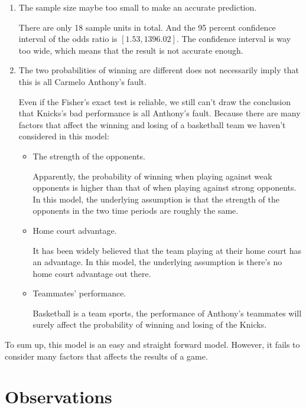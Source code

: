 \documentclass[12pt]{article}
\begin{document}
\begin{enumerate}
  \item The sample size maybe too small to make an accurate
    prediction.

  There are only 18 sample units in total. And the 95 percent
  confidence interval of the odds ratio is $[1.53, 1396.02]$. The
  confidence interval is way too wide, which means that the result is
  not accurate enough.
  \item The two probabilities of winning are different does not
    necessarily imply that this is all Carmelo Anthony's fault.

  Even if the Fisher's exact test is reliable, we still can't draw the
  conclusion that Knicks's bad performance is all Anthony's
  fault. Because there are many factors that affect the winning
  and losing of a basketball team we haven't considered in this model:

  \begin{itemize}
    \item The strength of the opponents.

      Apparently, the probability of winning when playing against
      weak opponents is higher than that of when playing against
      strong opponents. In this model, the underlying assumption is
      that the strength of the opponents in the two time periods are
      roughly the same.

    \item Home court advantage.

      It has been widely believed that the team playing at their home
      court has an advantage. In this model, the underlying assumption
      is there's no home court advantage out there.

    \item Teammates' performance.

      Basketball is a team sports, the performance of Anthony's
      teammates will surely affect the probability of winning and
      losing of the Knicks.

  \end{itemize}
\end{enumerate}

To sum up, this model is an easy and straight forward model. However,
it fails to consider many factors that affects the results of a
game.

\section{Observations}
\end{document}

